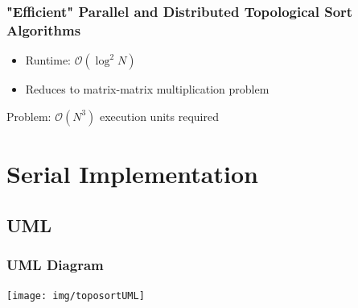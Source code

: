\begin{frame}
\frametitle{"Efficient" Parallel and Distributed Topological Sort Algorithms}

\begin{itemize}
	\item Runtime: $\mathcal{O} (\log^2 N)$
	\item Reduces to matrix-matrix multiplication problem
\end{itemize}

\begin{block}{Problem:}
	$\mathcal{O} (N^3)$ execution units required
\end{block}


\end{frame}




\section{Serial Implementation}

\subsection{UML}
\begin{frame}
	\frametitle{UML Diagram}
	\begin{center}
		\texttt{[image: img/toposortUML]}
	\end{center}
\end{frame}

